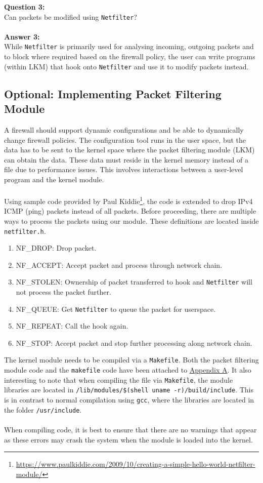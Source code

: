 \documentclass[a4paper,12pt]{article}
\begin{document}
\textbf{Question 3:}\\
Can packets be modified using \texttt{Netfilter}?\\\\
\textbf{Answer 3:}\\
While \texttt{Netfilter} is primarily used for analysing incoming, outgoing packets and to block where required based on the firewall policy, the user can write programs (within LKM) that hook onto \texttt{Netfilter} and use it to modify packets instead.
\subsection{Optional: Implementing Packet Filtering Module}
A firewall should support dynamic configurations and be able to dynamically change firewall policies. The configuration tool runs in the user space, but the data has to be sent to the kernel space where the packet filtering module (LKM) can obtain the data. These data must reside in the kernel memory instead of a file due to performance issues. This involves interactions between a user-level program and the kernel module.\\\\
Using sample code provided by Paul Kiddie\footnote{\url{https://www.paulkiddie.com/2009/10/creating-a-simple-hello-world-netfilter-module/}}, the code is extended to drop IPv4 ICMP (ping) packets instead of all packets. Before proceeding, there are multiple ways to process the packets using our module. These definitions are located inside \texttt{netfilter.h}.
\begin{enumerate}
\itemsep0em
\item NF\_DROP: Drop packet.
\item NF\_ACCEPT: Accept packet and process through network chain.
\item NF\_STOLEN: Ownership of packet transferred to hook and \texttt{Netfilter} will not process the packet further.
\item NF\_QUEUE: Get \texttt{Netfilter} to queue the packet for userspace.
\item NF\_REPEAT: Call the hook again.
\item NF\_STOP: Accept packet and stop further processing along network chain.
\end{enumerate}
The kernel module needs to be compiled via a \texttt{Makefile}. Both the packet filtering module code and the \texttt{makefile} code have been attached to \hyperref[ch:AppA]{Appendix A}. It also interesting to note that when compiling the file via \texttt{Makefile}, the module libraries are located in \texttt{/lib/modules/\$(shell uname -r)/build/include}. This is in contrast to normal compilation using \texttt{gcc}, where the libraries are located in the folder \texttt{/usr/include}.\\\\When compiling code, it is best to ensure that there are no warnings that appear as these errors may crash the system when the module is loaded into the kernel.
\end{document}

